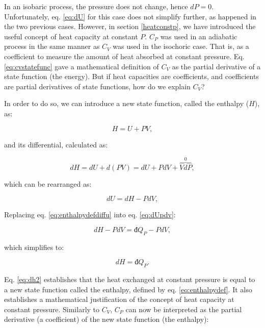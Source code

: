 \documentclass[
]{book}
\theoremstyle{definition}
\theoremstyle{definition}
\theoremstyle{definition}
\theoremstyle{remark}
\begin{document}
In an isobaric process, the pressure does not change, hence \(dP=0\). Unfortunately, eq. \eqref{eq:dU} for this case does not simplify further, as happened in the two previous cases. However, in section \ref{heatconstp}, we have introduced the useful concept of heat capacity at constant \(P\). \(C_P\) was used in an adiabatic process in the same manner as \(C_V\) was used in the isochoric case. That is, as a coefficient to measure the amount of heat absorbed at constant pressure. Eq. \eqref{eq:cvstatefunc} gave a mathematical definition of \(C_V\) as the partial derivative of a state function (the energy). But if heat capacities are coefficients, and coefficients are partial derivatives of state functions, how do we explain \(C_V\)?

In order to do so, we can introduce a new state function, called the enthalpy (\(H\)), as:

\begin{equation}
  H = U + PV,
  \label{eq:enthalpydef}
\end{equation}

and its differential, calculated as:

\begin{equation}
  dH = dU + d(PV) = dU + PdV + \overbrace{VdP}^{0},
  \label{eq:enthalpydefdiff}
\end{equation}

which can be rearranged as:

\begin{equation}
  dU = dH -PdV,
  \label{eq:enthalpydefdiffu}
\end{equation}

Replacing eq. \eqref{eq:enthalpydefdiffu} into eq. \eqref{eq:dUpdv}:

\begin{equation}
  dH -PdV = đ Q_P - PdV,
  \label{eq:dh1}
\end{equation}

which simplifies to:

\begin{equation}
  dH = đ Q_P.
  \label{eq:dh2}
\end{equation}

Eq. \eqref{eq:dh2} establishes that the heat exchanged at constant pressure is equal to a new state function called the enthalpy, defined by eq. \eqref{eq:enthalpydef}. It also establishes a mathematical justification of the concept of heat capacity at constant pressure. Similarly to \(C_V\), \(C_P\) can now be interpreted as the partial derivative (a coefficient) of the new state function (the enthalpy):
\end{document}
